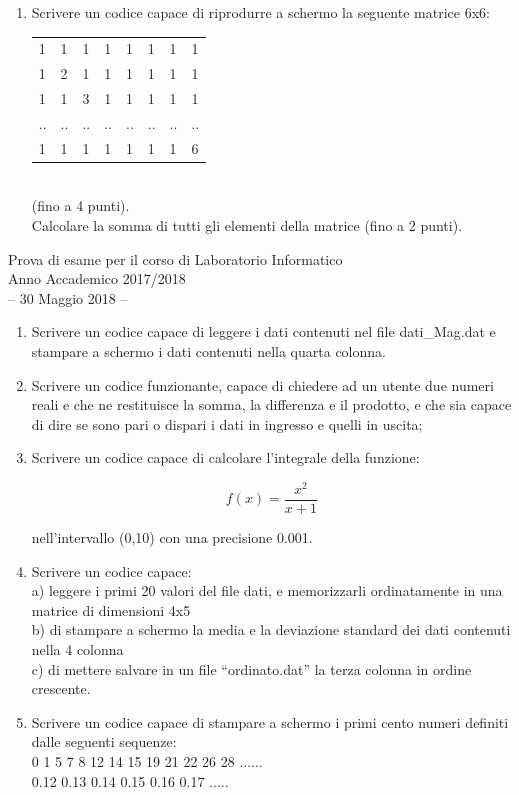 \documentclass[11pt,fleqn]{book} %
\begin{document}
\begin{enumerate}
\item  Scrivere un codice capace di riprodurre a schermo la seguente matrice 6x6:\\
\begin{tabular}{llllllll}
1 & 1 & 1 & 1 & 1 & 1 &   1 & 1\\
1 & 2 & 1 & 1 & 1 & 1 & 1 &   1\\
1 & 1 & 3 & 1 & 1 & 1 & 1 &  1\\
.. & .. & .. & .. & .. &.. & .. &   ..\\
1 & 1 & 1 & 1 & 1 & 1 & 1 &  6
\end{tabular}\\
(fino a 4 punti).\\
Calcolare la somma di tutti gli elementi della matrice (fino a 2 punti).

\end{enumerate}


{
\Large\centering
Prova di esame per il corso di Laboratorio Informatico\\		
Anno Accademico 2017/2018\\
-- 30 Maggio 2018 --\\
}


\begin{enumerate}
\item Scrivere un codice capace di  leggere i dati contenuti nel file  dati\_Mag.dat e stampare a schermo i dati contenuti nella quarta colonna.

\item Scrivere un codice funzionante, capace di chiedere ad un utente due numeri reali e che ne restituisce la somma, la differenza e il prodotto, e che sia capace di dire se sono pari o dispari i dati in ingresso e quelli in uscita; 

\item Scrivere un codice capace di calcolare l'integrale della funzione:

$$f(x) = \frac{x^2}{x+1}$$ 

nell'intervallo (0,10) con una precisione 0.001. 

\item Scrivere un codice capace:\\
     a) leggere i primi 20 valori del file dati, e memorizzarli ordinatamente in una matrice di dimensioni 4x5\\
     b) di stampare a schermo la media e la deviazione standard dei dati contenuti nella 4 colonna\\
     c) di mettere salvare in un file “ordinato.dat” la terza colonna in ordine crescente. 

\item Scrivere un codice capace di stampare a schermo i primi cento numeri definiti dalle seguenti sequenze:\\
0 1 5 7 8 12 14 15 19 21 22 26 28 ......\\ 
0.12  0.13  0.14  0.15  0.16  0.17 .....\\


\end{enumerate}
\end{document}
